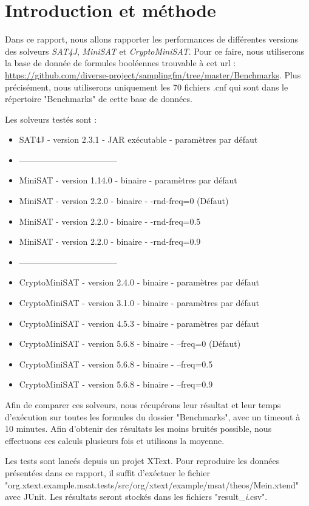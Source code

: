 \documentclass[11pt,a4paper]{article}
\author{Théo Gouzien - Théo Losekoot}
\begin{document}
\section{Introduction et méthode}

Dans ce rapport, nous allons rapporter les performances de différentes versions des solveurs \textit{SAT4J}, \textit{MiniSAT} et \textit{CryptoMiniSAT}.
Pour ce faire, nous utiliserons la base de donnée de formules booléennes trouvable à cet url : \url{https://github.com/diverse-project/samplingfm/tree/master/Benchmarks}.
Plus précisément, nous utiliserons uniquement les 70 fichiers .cnf qui sont dans le répertoire "Benchmarks" de cette base de données.

Les solveurs testés sont : 
\begin{itemize}
\item SAT4J - version 2.3.1 - JAR exécutable - paramètres par défaut 
\item -----------------------------------
\item MiniSAT - version 1.14.0 - binaire - paramètres par défaut
\item MiniSAT - version 2.2.0  - binaire - -rnd-freq=0 (Défaut)
\item MiniSAT - version 2.2.0  - binaire - -rnd-freq=0.5
\item MiniSAT - version 2.2.0  - binaire - -rnd-freq=0.9
\item -----------------------------------
\item CryptoMiniSAT - version 2.4.0 - binaire - paramètres par défaut
\item CryptoMiniSAT - version 3.1.0 - binaire - paramètres par défaut
\item CryptoMiniSAT - version 4.5.3 - binaire - paramètres par défaut
\item CryptoMiniSAT - version 5.6.8 - binaire - --freq=0 (Défaut)
\item CryptoMiniSAT - version 5.6.8 - binaire - --freq=0.5
\item CryptoMiniSAT - version 5.6.8 - binaire - --freq=0.9
\end{itemize}

Afin de comparer ces solveurs, nous récupérons leur résultat et leur temps d'exécution sur toutes les formules du dossier "Benchmarks", avec un timeout à 10 minutes. 
Afin d'obtenir des résultats les moins bruités possible, nous effectuons ces calculs plusieurs fois et utilisons la moyenne.

Les tests sont lancés depuis un projet XText. Pour reproduire les données présentées dans ce rapport, il suffit d'exéctuer le fichier "org.xtext.example.msat.tests/src/org/xtext/example/msat/theos/Mein.xtend" avec JUnit. Les résultats seront stockés dans les fichiers "result\_\textit{i}.csv".
\end{document}
